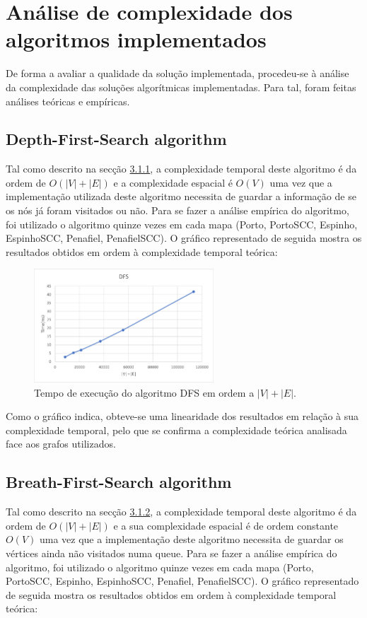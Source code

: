 \documentclass[12pt,a4paper]{report}
\begin{document}
\chapter{Análise de complexidade dos algoritmos implementados}

De forma a avaliar a qualidade da solução implementada, procedeu-se à análise da complexidade das soluções algorítmicas implementadas. 
Para tal, foram feitas análises teóricas e empíricas.


\section{Depth-First-Search algorithm}
Tal como descrito na secção \hyperref[algo:dfs]{3.1.1}, a complexidade temporal deste algoritmo é da ordem de \( O(|V| + |E|) \) e a complexidade espacial 
é \(O(V)\) uma vez que a implementação utilizada deste algoritmo necessita de guardar a informação de se os nós já foram visitados ou não.
Para se fazer a análise empírica do algoritmo, foi utilizado o algoritmo quinze vezes em cada mapa (Porto, PortoSCC, Espinho, EspinhoSCC, Penafiel, PenafielSCC).
O gráfico representado de seguida mostra os resultados obtidos em ordem à complexidade temporal teórica:

\begin{figure}[H]
	\includegraphics[width=0.6\textwidth]{./imgs/charts/DFSTimeComplexity.png}
	\centering
	\caption{Tempo de execução do algoritmo DFS em ordem a $|V|+|E|$.}
\end{figure}


Como o gráfico indica, obteve-se uma linearidade dos resultados em relação à sua complexidade temporal, pelo que se confirma a complexidade teórica
analisada face aos grafos utilizados.


\section{Breath-First-Search algorithm}
Tal como descrito na secção \hyperref[algo:bfs]{3.1.2}, a complexidade temporal deste algoritmo é da ordem de \( O(|V| + |E|) \) e a sua complexidade espacial
é de ordem constante \(O(V)\) uma vez que a implementação deste algoritmo necessita de guardar os vértices ainda não visitados numa queue.
Para se fazer a análise empírica do algoritmo, foi utilizado o algoritmo quinze vezes em cada mapa (Porto, PortoSCC, Espinho, EspinhoSCC, Penafiel, PenafielSCC).
O gráfico representado de seguida mostra os resultados obtidos em ordem à complexidade temporal teórica:
\end{document}
